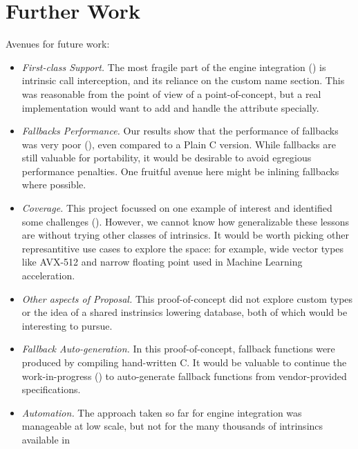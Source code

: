 \section{Further Work}
\label{sec:future}

Avenues for future work:

\begin{itemize}
    \item \emph{First-class  Support.}
        The most fragile part of the engine integration () is
        intrinsic call interception, and its reliance on the custom name
        section. This was reasonable from the point of view of a
        point-of-concept, but a real implementation would want to add and handle
        the  attribute specially.
    \item \emph{Fallbacks Performance.}
        Our results show that the performance of \wasm fallbacks was very poor
        (), even compared to a Plain C version.  While fallbacks
        are still valuable for portability, it would be desirable to avoid
        egregious performance penalties.  One fruitful avenue here might be
        inlining fallbacks where possible.
    \item \emph{Coverage.}
        This project focussed on one example of interest and identified some
        challenges (). However, we cannot know how
        generalizable these lessons are without trying other classes of
        intrinsics. It would be worth picking other represantitive use cases to
        explore the space: for example, wide vector types like AVX-512 and
        narrow floating point used in Machine Learning acceleration.
    \item \emph{Other aspects of  Proposal.}
        This proof-of-concept did not explore custom types or the idea of a
        shared instrinsics lowering database, both of which would be interesting
        to pursue.
    \item \emph{Fallback Auto-generation.}
        In this proof-of-concept, fallback functions were produced by compiling
        hand-written C.  It would be valuable to continue the work-in-progress
        () to auto-generate fallback functions from vendor-provided
        specifications.
    \item \emph{Automation.}
        The approach taken so far for engine integration was manageable at low
        scale, but not for the many thousands of intrinsincs available in

\end{itemize}
